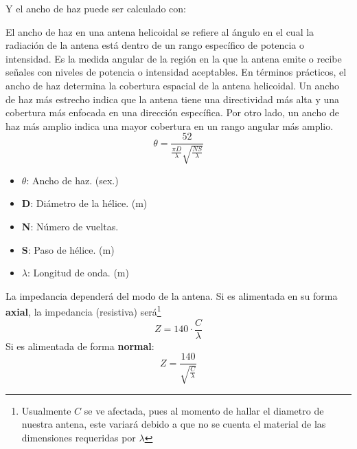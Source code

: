 \documentclass[
	12pt, %
	fleqn, %
	a4paper, %
	oneside, %
]{LegrandOrangeBook}
\begin{document}
Y el ancho de haz puede ser calculado con:
\begin{definition}
El ancho de haz en una antena helicoidal se refiere al ángulo en el cual la radiación de la antena está dentro de un rango específico de potencia o intensidad. Es la medida angular de la región en la que la antena emite o recibe señales con niveles de potencia o intensidad aceptables.
En términos prácticos, el ancho de haz determina la cobertura espacial de la antena helicoidal. Un ancho de haz más estrecho indica que la antena tiene una directividad más alta y una cobertura más enfocada en una dirección específica. Por otro lado, un ancho de haz más amplio indica una mayor cobertura en un rango angular más amplio.
\begin{equation}
\theta=\frac{52}{\frac{\pi D}{\lambda}\sqrt{\frac{NS}{\lambda}}}
\end{equation}
\begin{itemize}
\item $\theta$: Ancho de haz. (sex.)
\item \textbf{D}: Diámetro de la hélice. (m)
\item \textbf{N}: Número de vueltas.
\item \textbf{S}: Paso de hélice. (m)
\item $\lambda$: Longitud de onda. (m)
\end{itemize}
\end{definition}
\begin{definition}[Impedancia]
La impedancia dependerá del modo de la antena. Si es alimentada en su forma \textbf{axial}, la impedancia (resistiva) será\footnote{Usualmente $C$ se ve afectada, pues al momento de hallar el diametro de nuestra antena, este variará debido a que no se cuenta el material de las dimensiones requeridas por $\lambda$}
\begin{equation}
Z=140\cdot \frac{C}{\lambda}
\end{equation}
Si es alimentada de forma \textbf{normal}:
\begin{equation}
Z=\frac{140}{\sqrt{\frac{C}{\lambda}}}
\end{equation}
\end{definition}
\end{document}
